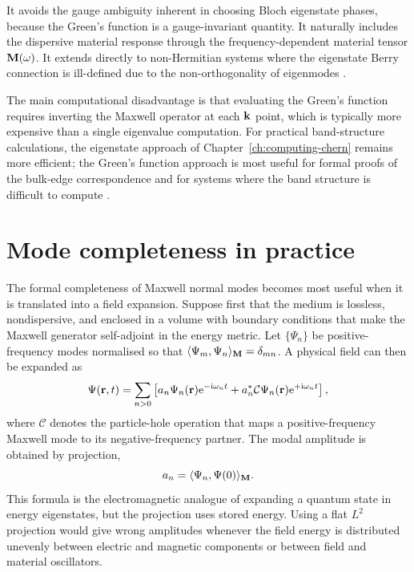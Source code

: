 It avoids the gauge ambiguity inherent in choosing Bloch eigenstate
phases, because the Green's function is a gauge-invariant quantity.
It naturally includes the dispersive material response through the
frequency-dependent material tensor $\mathbf{M}(\omega)$.  It extends
directly to non-Hermitian systems where the eigenstate Berry
connection is ill-defined due to the non-orthogonality of eigenmodes
\cite{web2026r,gao2015observation}.

The main computational disadvantage is that evaluating the Green's
function requires inverting the Maxwell operator at each $\mathbf{k}$
point, which is typically more expensive than a single eigenvalue
computation.  For practical band-structure calculations, the
eigenstate approach of Chapter~\ref{ch:computing-chern} remains
more efficient; the Green's function approach is most useful for
formal proofs of the bulk-edge correspondence and for systems where
the band structure is difficult to compute
\cite{silveirinha2016bulk,ozawa2018topological}.

\section{Mode completeness in practice}
\label{sec:ch3-completeness-practice}

The formal completeness of Maxwell normal modes becomes most useful
when it is translated into a field expansion.  Suppose first that the
medium is lossless, nondispersive, and enclosed in a volume with
boundary conditions that make the Maxwell generator self-adjoint in the
energy metric.  Let $\{\Psi_n\}$ be positive-frequency modes normalised
so that $\langle\Psi_m,\Psi_n\rangle_{\mathbf{M}}=\delta_{mn}$.  A physical
field can then be expanded as
\begin{equation}\label{eq:ch3-modal-expansion}
  \Psi(\mathbf{r},t)
  = \sum_{n>0}\left[a_n\Psi_n(\mathbf{r})\mathrm{e}^{-\mathrm{i}\omega_n t}
  + a_n^*\mathcal{C}\Psi_n(\mathbf{r})\mathrm{e}^{+\mathrm{i}\omega_n t}\right],
\end{equation}
where $\mathcal{C}$ denotes the particle-hole operation that maps a
positive-frequency Maxwell mode to its negative-frequency partner.  The
modal amplitude is obtained by projection,
\begin{equation}\label{eq:ch3-modal-amplitude}
  a_n = \langle\Psi_n,\Psi(0)\rangle_{\mathbf{M}}.
\end{equation}
This formula is the electromagnetic analogue of expanding a quantum
state in energy eigenstates, but the projection uses stored energy.
Using a flat $L^2$ projection would give wrong amplitudes whenever the
field energy is distributed unevenly between electric and magnetic
components or between field and material oscillators.

